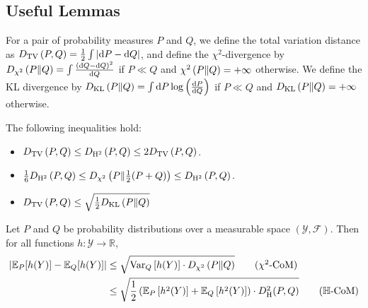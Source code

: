 \subsection{Useful Lemmas}
\label{subsec:useful-lemmas}



For a pair of probability measures $P$ and $Q$, we define the total variation distance as $D_{\mathrm{TV}} \left( P , Q \right)=\frac{1}{2}\int\vert \mathrm{d}P-\mathrm{d}Q \vert$, and define the $\chi^2$-divergence by $D_{\chi^2} \left( P \| Q \right)=\int\frac{(\mathrm{d}Q-\mathrm{d}Q)^2}{\mathrm{d}Q}$ if $P\ll Q$ and $\chi^2\left( P \| Q \right)=+\infty$ otherwise. We define the KL divergence by $D_{\mathrm{KL}} \left( P \| Q \right)= \int{} \mathrm{d}P\log\left( \frac{\mathrm{d}P}{\mathrm{d}Q} \right)$ if $P\ll Q$ and $D_{\mathrm{KL}} \left( P \| Q \right)=+\infty$ otherwise.


  \begin{lemma}
    \label{lem:pinsker}
    The following inequalities hold:
    \begin{itemize}
    \item $D_{\mathrm{TV}} \left( P , Q \right)\leq D_{\mathrm{H}^2} \left( P , Q \right)\leq 2D_{\mathrm{TV}} \left( P , Q \right)$.%
    \item $\frac{1}{6}D_{\mathrm{H}^2} \left( P , Q \right)
      \leq D_{\chi^2} \left( P \| \frac{1}{2}(P+Q) \right)
      \leq  D_{\mathrm{H}^2} \left( P , Q \right) 
      $.
    \item $D_{\mathrm{TV}} \left( P , Q \right) \leq \sqrt{\frac{1}{2} D_{\mathrm{KL}} \left( P \| Q \right)}$
    \end{itemize}
  \end{lemma}


\begin{lemma} \label{lemma:CoM} Let $P$ and $Q$ be probability distributions over a measurable space $(\mathcal{Y}, \mathscr{F})$. Then for all functions $h: \mathcal{Y} \rightarrow \mathbb{R}$,
\label{lem:change-of-measure}
\begin{align}
    \left|\mathbb{E}_{P} [h(Y)]-\mathbb{E}_{Q} [h(Y)]\right| &\leq \sqrt{\Var_Q \left[h(Y)\right] \cdot \chisq{P}{Q}} \tag{$\chi^2$-CoM} \label{eq:chi2CoM}\\
    &\leq \sqrt{\frac{1}{2}\left(\mathbb{E}_P \left[h^2(Y )\right]+\mathbb{E}_Q \left[h^2(Y)\right]\right) \cdot D_{\mathrm{H}}^2(P,Q)} \label{eq:HellCoM}\tag{$\mathbb{H}$-CoM}
\end{align}
\end{lemma}

